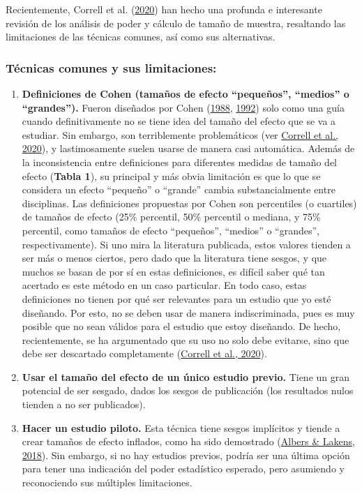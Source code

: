 \documentclass[
]{article}
\providecommand{\tightlist}{%
  \setlength{\itemsep}{0pt}\setlength{\parskip}{0pt}}
\begin{document}
Recientemente, Correll et al.
(\protect\hyperlink{ref-correllAvoidCohenSmall2020}{2020}) han hecho una
profunda e interesante revisión de los análisis de poder y cálculo de
tamaño de muestra, resaltando las limitaciones de las técnicas comunes,
así como sus alternativas.

\hypertarget{tuxe9cnicas-comunes-y-sus-limitaciones}{%
\subsubsection{Técnicas comunes y sus
limitaciones:}\label{tuxe9cnicas-comunes-y-sus-limitaciones}}

\begin{enumerate}
\def\labelenumi{\arabic{enumi}.}
\tightlist
\item
  \textbf{Definiciones de Cohen (tamaños de efecto ``pequeños'',
  ``medios'' o ``grandes'').} Fueron diseñados por Cohen
  (\protect\hyperlink{ref-cohenStatisticalPowerAnalysis1988}{1988},
  \protect\hyperlink{ref-cohenPowerPrimer1992}{1992}) solo como una guía
  cuando definitivamente no se tiene idea del tamaño del efecto que se
  va a estudiar. Sin embargo, son terriblemente problemáticos (ver
  \protect\hyperlink{ref-correllAvoidCohenSmall2020}{Correll et al.,
  2020}), y lastimosamente suelen usarse de manera casi automática.
  Además de la inconsistencia entre definiciones para diferentes medidas
  de tamaño del efecto (\textbf{Tabla 1}), su principal y más obvia
  limitación es que lo que se considera un efecto ``pequeño'' o
  ``grande'' cambia substancialmente entre disciplinas. Las definiciones
  propuestas por Cohen son percentiles (o cuartiles) de tamaños de
  efecto (25\% percentil, 50\% percentil o mediana, y 75\% percentil,
  como tamaños de efecto ``pequeños'', ``medios'' o ``grandes'',
  respectivamente). Si uno mira la literatura publicada, estos valores
  tienden a ser más o menos ciertos, pero dado que la literatura tiene
  sesgos, y que muchos se basan de por sí en estas definiciones, es
  difícil saber qué tan acertado es este método en un caso particular.
  En todo caso, estas definiciones no tienen por qué ser relevantes para
  un estudio que yo esté diseñando. Por esto, no se deben usar de manera
  indiscriminada, pues es muy posible que no sean válidos para el
  estudio que estoy diseñando. De hecho, recientemente, se ha
  argumentado que su uso no solo debe evitarse, sino que debe ser
  descartado completamente
  (\protect\hyperlink{ref-correllAvoidCohenSmall2020}{Correll et al.,
  2020}).
\item
  \textbf{Usar el tamaño del efecto de un único estudio previo.} Tiene
  un gran potencial de ser sesgado, dados los sesgos de publicación (los
  resultados nulos tienden a no ser publicados).
\item
  \textbf{Hacer un estudio piloto.} Esta técnica tiene sesgos implícitos
  y tiende a crear tamaños de efecto inflados, como ha sido demostrado
  (\protect\hyperlink{ref-albersWhenPowerAnalyses2018}{Albers \& Lakens,
  2018}). Sin embargo, si no hay estudios previos, podría ser una última
  opción para tener una indicación del poder estadístico esperado, pero
  asumiendo y reconociendo sus múltiples limitaciones.
\end{enumerate}
\end{document}
